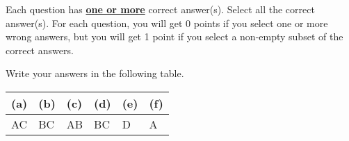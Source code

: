 
Each question has \underline{\textbf{one or more}} correct answer(s). Select all the correct answer(s). For each question, you will get 0 points if you select one or more wrong answers, but you will get 1 point if you select a non-empty subset of the correct answers.

Write your answers in the following table.


\begin{table}[htbp]
	\centering
	\begin{tabular}{|p{1.5cm}|p{1.5cm}|p{1.5cm}|p{1.5cm}|p{1.5cm}|p{1.5cm}|}
		\hline
		(a) & (b) & (c) & (d) & (e) & (f) \\
		\hline
		AC  & BC  & AB  & BC  & D   & A   \\
		\hline
	\end{tabular}
\end{table}

